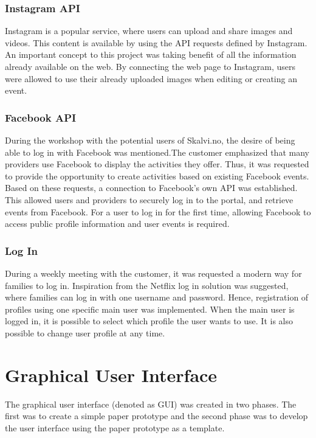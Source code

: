\subsubsection{Instagram API}
Instagram is a popular service, where users can upload and share images and videos. This content is available by using the API requests defined by Instagram. An important concept to this project was taking benefit of all the information already available on the web. By connecting the web page to Instagram, users were allowed to use their already uploaded images when editing or creating an event.

\subsubsection{Facebook API}
During the workshop with the potential users of Skalvi.no, the desire of being able to log in with Facebook was mentioned.The customer emphasized that many providers use Facebook to display the activities they offer. Thus, it was requested to provide the opportunity to create activities based on existing Facebook events. Based on these requests, a connection to Facebook's own API was established. This allowed users and providers to securely log in to the portal, and retrieve events from Facebook. For a user to log in for the first time, allowing Facebook to access public profile information and user events is required. 

\subsubsection{Log In}
During a weekly meeting with the customer, it was requested a modern way for families to log in. Inspiration from the Netflix log in solution was suggested, where families can log in with one username and password. Hence, registration of profiles using one specific main user was implemented. When the main user is logged in, it is possible to select which profile the user wants to use. It is also possible to change user profile at any time.

\section{Graphical User Interface}
\label{s:graphical_user_interface}
The graphical user interface (denoted as GUI) was created in two phases. The first was to create a simple paper prototype and the second phase was to develop the user interface using the paper prototype as a template.

